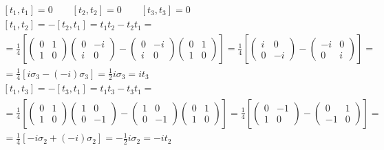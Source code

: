 \documentclass{article}
\begin{document}
\begin{equation}
\begin{gathered}
    \left[t_1,t_1\right] = 0
    \qquad
    \left[t_2,t_2\right] = 0
    \qquad
    \left[t_3,t_3\right] = 0
    \\
    \left[t_1,t_2\right] = - \left[t_2,t_1\right] = t_1t_2 - t_2t_1 = \\ = \frac{1}{4}\left[\begin{pmatrix}0&1\\1&0\end{pmatrix}\begin{pmatrix}0&-i\\i&0\end{pmatrix} - \begin{pmatrix}0&-i\\i&0\end{pmatrix}\begin{pmatrix}0&1\\1&0\end{pmatrix}\right] = \frac{1}{4}\left[\begin{pmatrix}i&0\\0&-i\end{pmatrix} - \begin{pmatrix}-i&0\\0&i\end{pmatrix}\right] = \\ = \frac{1}{4}\left[i\sigma_3 - \left(-i\right)\sigma_3\right] = \frac{1}{2}i\sigma_3 = it_3
    \\
    \left[t_1,t_3\right] = - \left[t_3,t_1\right] = t_1t_3 - t_3t_1 = \\ = \frac{1}{4}\left[\begin{pmatrix}0&1\\1&0\end{pmatrix}\begin{pmatrix}1&0\\0&-1\end{pmatrix} - \begin{pmatrix}1&0\\0&-1\end{pmatrix}\begin{pmatrix}0&1\\1&0\end{pmatrix}\right] = \frac{1}{4}\left[\begin{pmatrix}0&-1\\1&0\end{pmatrix} - \begin{pmatrix}0&1\\-1&0\end{pmatrix}\right] = \\ = \frac{1}{4}\left[-i\sigma_2 + \left(-i\right)\sigma_2\right] = -\frac{1}{2}i\sigma_2 = -it_2

\end{gathered}
\end{equation}
\end{document}
